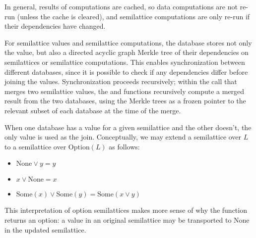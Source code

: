 \documentclass{article}
\begin{document}
    In general, results of computations are cached, so data computations are not re-run (unless the cache is cleared), and semilattice computations are only re-run if their dependencies have changed.

    For semilattice values and semilattice computations, the database stores not only the value, but also a directed acyclic graph Merkle tree of their dependencies on semilattices or semilattice computations. This enables synchronization between different databases, since it is possible to check if any dependencies differ before joining the values. Synchronization proceeds recursively; within the \join{} call that merges two semilattice values, the \latticelookup{} and \latticecomputationlookup{} functions recursively compute a merged result from the two databases, using the Merkle trees as a frozen pointer to the relevant subset of each database at the time of the merge.

    When one database has a value for a given semilattice and the other doesn't, the only value is used as the join. Conceptually, we may extend a semilattice over $L$ to a semilattice over $\mathrm{Option}(L)$ as follows:

    \begin{itemize}
      \item $\mathrm{None} \vee y = y$
      \item $x \vee \mathrm{None} = x$
      \item $\mathrm{Some}(x) \vee \mathrm{Some}(y) = \mathrm{Some}(x \vee y)$
    \end{itemize}

    This interpretation of option semilattices makes more sense of why the \transport function returns an option: a value in an original semilattice may be transported to $\mathrm{None}$ in the updated semilattice.
\end{document}
